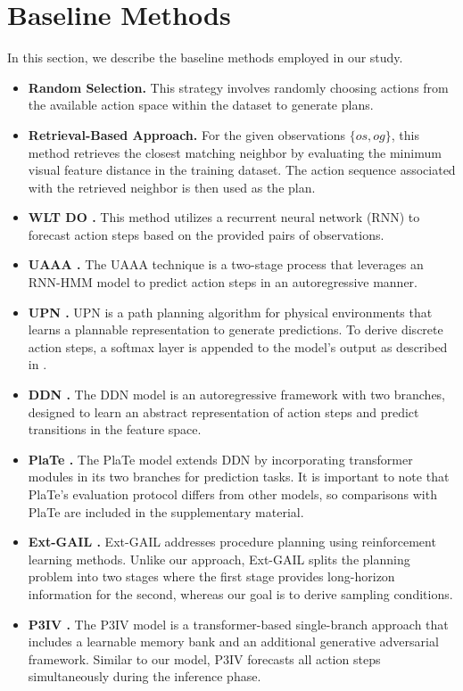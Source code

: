 \section{Baseline Methods}
In this section, we describe the baseline methods employed in our study.
\begin{itemize}
    \item \textbf{Random Selection.} This strategy involves randomly choosing actions from the available action space within the dataset to generate plans.
    \item \textbf{Retrieval-Based Approach.} For the given observations \(\{os, og \}\), this method retrieves the closest matching neighbor by evaluating the minimum visual feature distance in the training dataset. The action sequence associated with the retrieved neighbor is then used as the plan.
    \item \textbf{WLT DO \cite{10}.} This method utilizes a recurrent neural network (RNN) to forecast action steps based on the provided pairs of observations.
    \item \textbf{UAAA \cite{11}.} The UAAA technique is a two-stage process that leverages an RNN-HMM model to predict action steps in an autoregressive manner.
    \item \textbf{UPN \cite{33}.} UPN is a path planning algorithm for physical environments that learns a plannable representation to generate predictions. To derive discrete action steps, a softmax layer is appended to the model's output as described in \cite{4}.
    \item \textbf{DDN \cite{4}.} The DDN model is an autoregressive framework with two branches, designed to learn an abstract representation of action steps and predict transitions in the feature space.
    \item \textbf{PlaTe \cite{34}.} The PlaTe model extends DDN by incorporating transformer modules in its two branches for prediction tasks. It is important to note that PlaTe's evaluation protocol differs from other models, so comparisons with PlaTe are included in the supplementary material.
    \item \textbf{Ext-GAIL \cite{2}.} Ext-GAIL addresses procedure planning using reinforcement learning methods. Unlike our approach, Ext-GAIL splits the planning problem into two stages where the first stage provides long-horizon information for the second, whereas our goal is to derive sampling conditions.
    \item \textbf{P3IV \cite{42}.} The P3IV model is a transformer-based single-branch approach that includes a learnable memory bank and an additional generative adversarial framework. Similar to our model, P3IV forecasts all action steps simultaneously during the inference phase.
\end{itemize}

